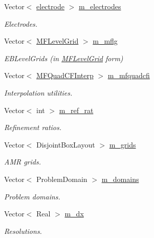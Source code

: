 \begin{DoxyCompactItemize}
Vector$<$ \hyperlink{classelectrode}{electrode} $>$ \hyperlink{classmfconductivityopfactory_ac1418a8f71e5aadb90960d4e24bb7799}{m\+\_\+electrodes}
\begin{DoxyCompactList}\small\item\em Electrodes. \end{DoxyCompactList}\item 
Vector$<$ \hyperlink{classMFLevelGrid}{M\+F\+Level\+Grid} $>$ \hyperlink{classmfconductivityopfactory_a8d1b2ca5d33ce5b26aee1fc000b66f17}{m\+\_\+mflg}
\begin{DoxyCompactList}\small\item\em E\+B\+Level\+Grids (in \hyperlink{classMFLevelGrid}{M\+F\+Level\+Grid} form) \end{DoxyCompactList}\item 
Vector$<$ \hyperlink{classMFQuadCFInterp}{M\+F\+Quad\+C\+F\+Interp} $>$ \hyperlink{classmfconductivityopfactory_a9b374566612b8904f2f94e2a8e439229}{m\+\_\+mfquadcfi}
\begin{DoxyCompactList}\small\item\em Interpolation utilities. \end{DoxyCompactList}\item 
Vector$<$ int $>$ \hyperlink{classmfconductivityopfactory_aabc50b386478f0673828dbfbba071ba9}{m\+\_\+ref\+\_\+rat}
\begin{DoxyCompactList}\small\item\em Refinement ratios. \end{DoxyCompactList}\item 
Vector$<$ Disjoint\+Box\+Layout $>$ \hyperlink{classmfconductivityopfactory_a86838ee0b3579be00179ff3391185dd9}{m\+\_\+grids}
\begin{DoxyCompactList}\small\item\em A\+MR grids. \end{DoxyCompactList}\item 
Vector$<$ Problem\+Domain $>$ \hyperlink{classmfconductivityopfactory_a7f808b27a90660d2912fd5c47da676f4}{m\+\_\+domains}
\begin{DoxyCompactList}\small\item\em Problem domains. \end{DoxyCompactList}\item 
Vector$<$ Real $>$ \hyperlink{classmfconductivityopfactory_a994a318799e0fcc9e151a10c4e2de5df}{m\+\_\+dx}
\begin{DoxyCompactList}\small\item\em Resolutions. \end{DoxyCompactList}\item 

\end{DoxyCompactItemize}
